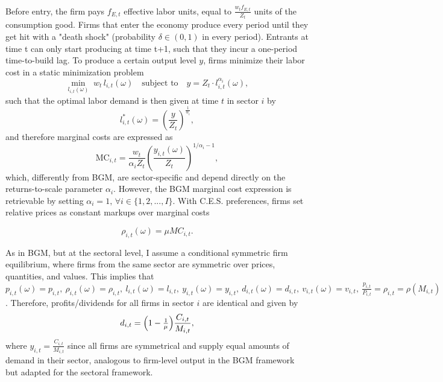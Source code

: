 \documentclass[a4paper,12pt]{article} %
\numberwithin{equation}{section} %
\numberwithin{figure}{section}
\numberwithin{table}{section}
\begin{document}
Before entry, the firm pays $f_{E,t}$ effective labor units, equal to $\frac{w_tf_{E,t}}{Z_t}$ units of the consumption good. 
Firms that enter the economy produce every period until they get hit with a "death shock" (probability $\delta \in (0,1)$ in every period). 
Entrants at time t can only start producing at time t+1, such that they incur a one-period time-to-build lag. 
To produce a certain output level $y$, firms minimize their labor cost in a static minimization problem
\[
    \min_{l_{i,t}(\omega)} \; w_t\,l_{i,t}(\omega) \quad \text{subject to} \quad y = Z_t \cdot l_{i,t}^{\alpha_i}(\omega),
\]
such that the optimal labor demand is then given at time $t$ in sector $i$ by 
\begin{equation}
  l_{i,t}^*(\omega) = \left(\frac{y}{Z_t}\right)^{\frac{1}{\alpha_i}},\label{eq:laborClearing}
\end{equation}
and therefore marginal costs are expressed as
\begin{equation}
  \text{MC}_{i,t} = \frac{w_t}{\alpha_i Z_t}\left(\frac{y_{i,t}(\omega)}{Z_t}\right)^{\!1/\alpha_i-1},\label{eq:marginalcost}
\end{equation}
which, differently from BGM, are sector-specific and depend directly on the returns-to-scale parameter $\alpha_i$. However, the BGM
marginal cost expression is retrievable by setting $\alpha_i = 1, \, \forall i \in \{1,2,...,I\}$. With C.E.S. preferences, firms set relative
prices as constant markups over marginal costs 

\begin{equation}
  \rho_{i,t}(\omega) = \mu MC_{i,t}.\label{eq:pricing}
\end{equation}

As in BGM, but at the sectoral level, I assume a conditional symmetric firm equilibrium, where firms from the same sector 
are symmetric over prices, quantities, and values. 
This implies that $p_{i,t}(\omega) = p_{i,t}, \ \rho_{i,t}(\omega) = \rho_{i,t}   , \   l_{i,t}(\omega) = l_{i,t}   , 
\  y_{i,t}(\omega) = y_{i,t}   , \  d_{i,t}(\omega) = d_{i,t}   ,  \ v_{i,t}(\omega) = v_{i,t}   , \  
\frac{p_{i,t}}{P_{i,t}} = \rho_{i,t} = \rho(M_{i,t})$. Therefore, profits/dividends for all firms in 
sector $i$ are identical and given by
\begin{equation}
  d_{i,t} = \Bigl(1-\tfrac1\mu\Bigr)\frac{C_{i,t}}{M_{i,t}}, \label{eq:profit}
\end{equation}
where $y_{i,t} = \frac{C_{i,t}}{M_{i,t}}$ since all firms are symmetrical and supply equal amounts of demand in their sector, analogous to firm-level
output in the BGM framework but adapted for the sectoral framework.
\end{document}
